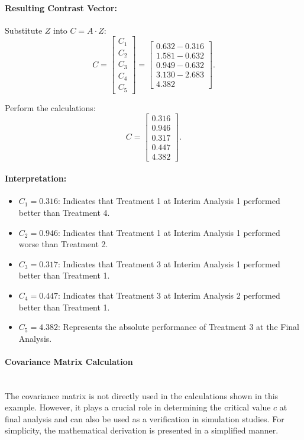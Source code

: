 \documentclass[11pt, a4paper]{article}\usepackage[]{graphicx}\usepackage[]{xcolor}
\begin{document}
\paragraph{Resulting Contrast Vector:}
Substitute \( Z \) into \( C = A \cdot Z \):
\[
C =
\begin{bmatrix}
C_1 \\ C_2 \\ C_3 \\ C_4 \\ C_5
\end{bmatrix}
=
\begin{bmatrix}
0.632 - 0.316 \\
1.581 - 0.632 \\
0.949 - 0.632 \\
3.130 - 2.683 \\
4.382
\end{bmatrix}.
\]

Perform the calculations:
\[
C =
\begin{bmatrix}
0.316 \\
0.946 \\
0.317 \\
0.447 \\
4.382
\end{bmatrix}.
\]

\paragraph{Interpretation:}
\begin{itemize}
    \item \( C_1 = 0.316 \): Indicates that Treatment 1 at Interim Analysis 1 performed better than Treatment 4.
    \item \( C_2 = 0.946 \): Indicates that Treatment 1 at Interim Analysis 1 performed worse than Treatment 2.
    \item \( C_3 = 0.317 \): Indicates that Treatment 3 at Interim Analysis 1 performed better than Treatment 1.
    \item \( C_4 = 0.447 \): Indicates that Treatment 3 at Interim Analysis 2 performed better than Treatment 1.
    \item \( C_5 = 4.382 \): Represents the absolute performance of Treatment 3 at the Final Analysis.
\end{itemize}




\paragraph{Covariance Matrix Calculation}\\
The covariance matrix is not directly used in the calculations shown in this example. However, it plays a crucial role in determining the critical value \(c\) at final analysis and can also be used as a verification in simulation studies. For simplicity, the mathematical derivation is presented in a simplified manner.
\end{document}
